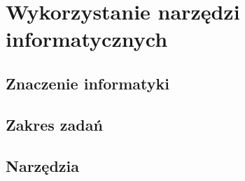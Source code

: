 \chapter{Wykorzystanie narzędzi informatycznych}
\label{c3:c3}

\section{Znaczenie informatyki}

\section{Zakres zadań}

\section{Narzędzia}